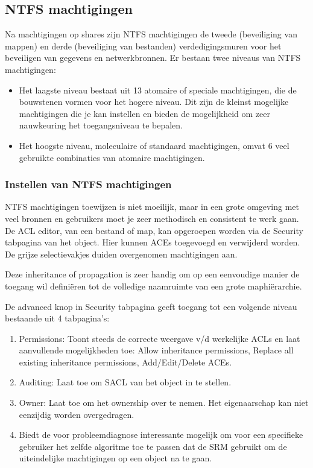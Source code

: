 \subsection{NTFS machtigingen}

Na machtigingen op shares zijn NTFS machtigingen de tweede (beveiliging van
mappen) en derde (beveiliging van bestanden) verdedigingsmuren voor het
beveiligen van gegevens en netwerkbronnen. Er bestaan twee niveaus van NTFS
machtigingen:
\begin{itemize}
	\item Het laagste niveau bestaat uit 13 atomaire of speciale
		machtigingen, die de bouwstenen vormen voor het hogere niveau.
		Dit zijn de kleinst mogelijke machtigingen die je kan instellen 
		en bieden de mogelijkheid om zeer nauwkeuring het toegangsniveau te
		bepalen.
	\item Het hoogste niveau, moleculaire of standaard machtigingen, omvat 6
		veel gebruikte combinaties van atomaire machtigingen.
\end{itemize}

\subsubsection{Instellen van NTFS machtigingen}

NTFS machtigingen toewijzen is niet moeilijk, maar in een grote omgeving met
veel bronnen en gebruikers moet je zeer methodisch en consistent te werk gaan.
De ACL editor, van een bestand of map, kan opgeroepen worden via de Security
tabpagina van het object. Hier kunnen ACEs toegevoegd en verwijderd worden. De
grijze selectievakjes duiden overgenomen machtigingen aan.

Deze inheritance of propagation is zeer handig om op een eenvoudige manier de
toegang wil definiëren tot de volledige naamruimte van een grote maphiërarchie.

De advanced knop in Security tabpagina geeft toegang tot een volgende niveau
bestaande uit 4 tabpagina's:
\begin{enumerate}
	\item Permissions: Toont steeds de correcte weergave v/d werkelijke
		ACLs en laat aanvullende mogelijkheden toe: Allow inheritance
		permissions, Replace all existing inheritance permissions,
		Add/Edit/Delete ACEs.
	\item Auditing: Laat toe om SACL van het object in te stellen.
	\item Owner: Laat toe om het ownership over te nemen. Het eigenaarschap
		kan niet eenzijdig worden overgedragen.
	\item Biedt de voor probleemdiagnose interessante mogelijk om voor een
		specifieke gebruiker het zelfde algoritme toe te passen dat de
		SRM gebruikt om de uiteindelijke machtigingen op een object na
		te gaan.
\end{enumerate}

